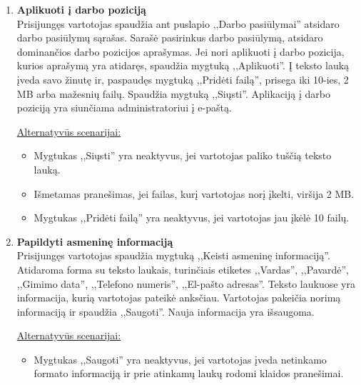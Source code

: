 \documentclass{VUMIFPSkursinis}
\begin{document}
\begin{enumerate} [label = \textbf{U\arabic*.}]
				\underline{Alternatyvūs scenarijai:}
				\begin{itemize}
					\item Mygtukas ,,Registruoti komandą'' yra neaktyvus, jei jau yra viršytas maksimalus dalyvių skaičius.
					\item Mygtukas ,,Registruoti'' yra neaktyvus, jei nepasirinkta komanda.
					\item Jei vartotojas neturi komandų, jis nukeliamas į komandos kūrimo puslapį.
				\end{itemize}
				
			\item \textbf{Aplikuoti į darbo poziciją} \\
				Prisijungęs vartotojas spaudžia ant puslapio ,,Darbo pasiūlymai'' atsidaro darbo pasiūlymų sąrašas. Sarašė pasirinkus darbo pasiūlymą, atsidaro dominančios darbo pozicijos aprašymas. Jei nori aplikuoti į darbo pozicija, kurios aprašymą yra atidaręs, spaudžia mygtuką ,,Aplikuoti''. Į teksto lauką įveda savo žinutę ir, paspaudęs mygtuką ,,Pridėti failą'', prisega iki 10-ies, 2 MB arba mažesnių failų. Spaudžia mygtuką ,,Siųsti''. Aplikaciją į darbo poziciją yra siunčiama administratoriui į e-paštą.
				
				\underline{Alternatyvūs scenarijai:}
				\begin{itemize}
					\item Mygtukas ,,Siųsti'' yra neaktyvus, jei vartotojas paliko tuščią teksto lauką.
					\item Išmetamas pranešimas, jei failas, kurį vartotojas norį įkelti, viršija 2 MB.
					\item Mygtukas ,,Pridėti failą'' yra neaktyvus, jei vartotojas jau įkėlė 10 failų.
				\end{itemize}
				
			\item \textbf{Papildyti asmeninę informaciją} \\
				Prisijungęs vartotojas spaudžia mygtuką ,,Keisti asmeninę informaciją''. Atidaroma forma su teksto laukais, turinčiais etiketes ,,Vardas'', ,,Pavardė'', ,,Gimimo data'', ,,Telefono numeris'', ,,El-pašto adresas''. Teksto laukuose yra informacija, kurią vartotojas pateikė anksčiau. Vartotojas pakeičia norimą informaciją ir spaudžia ,,Saugoti''. Nauja informacija yra išsaugoma.
				
				\underline{Alternatyvūs scenarijai:}
				\begin{itemize}
					\item Mygtukas ,,Saugoti'' yra neaktyvus, jei vartotojas įveda netinkamo formato informaciją ir prie atinkamų laukų rodomi klaidos pranešimai.
				\end{itemize}


\end{enumerate}
\end{document}
